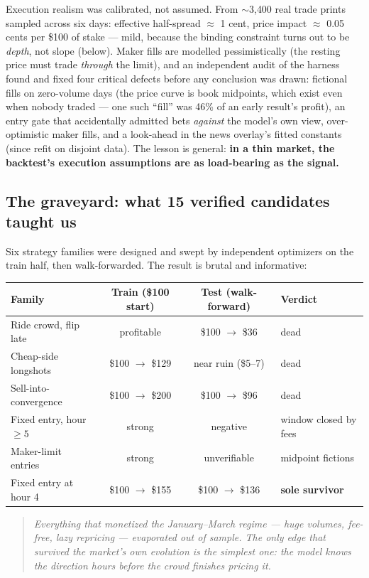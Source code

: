 \documentclass[11pt,a4paper]{article}
\newcommand{\intuition}[1]{\begin{quote}\small\itshape #1\end{quote}}
\begin{document}
Execution realism was calibrated, not assumed. From $\sim$3{,}400 real trade
prints sampled across six days: effective half-spread $\approx$ 1 cent,
price impact $\approx$ 0.05 cents per \$100 of stake --- mild, because the
binding constraint turns out to be \emph{depth}, not slope (below). Maker
fills are modelled pessimistically (the resting price must trade
\emph{through} the limit), and an independent audit of the harness found and
fixed four critical defects before any conclusion was drawn: fictional fills
on zero-volume days (the price curve is book midpoints, which exist even
when nobody traded --- one such ``fill'' was 46\% of an early result's
profit), an entry gate that accidentally admitted bets \emph{against} the
model's own view, over-optimistic maker fills, and a look-ahead in the news
overlay's fitted constants (since refit on disjoint data). The lesson is
general: \textbf{in a thin market, the backtest's execution assumptions are
as load-bearing as the signal.}

\subsection{The graveyard: what 15 verified candidates taught us}

Six strategy families were designed and swept by independent optimizers on
the train half, then walk-forwarded. The result is brutal and informative:

\begin{center}
\begin{tabular}{lccl}
\toprule
Family & Train (\$100 start) & Test (walk-forward) & Verdict \\
\midrule
Ride crowd, flip late & profitable & \$100 $\to$ \$36 & dead \\
Cheap-side longshots & \$100 $\to$ \$129 & near ruin (\$5--7) & dead \\
Sell-into-convergence & \$100 $\to$ \$200 & \$100 $\to$ \$96 & dead \\
Fixed entry, hour $\ge 5$ & strong & negative & window closed by fees \\
Maker-limit entries & strong & unverifiable & midpoint fictions \\
Fixed entry at hour 4 & \$100 $\to$ \$155 & \$100 $\to$ \$136 & \textbf{sole survivor} \\
\bottomrule
\end{tabular}
\end{center}

\intuition{Everything that monetized the January--March regime --- huge
volumes, fee-free, lazy repricing --- evaporated out of sample. The only
edge that survived the market's own evolution is the simplest one: the model
knows the direction hours before the crowd finishes pricing it.}
\end{document}
